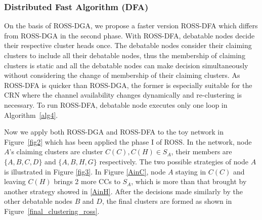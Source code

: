 \documentclass[10pt,journal,compsoc]{IEEEtran}
\theoremstyle{mytheoremstyle}
\theoremstyle{mytheoremstyle}
\theoremstyle{mytheoremstyle}
\begin{document}
\subsubsection{Distributed Fast Algorithm (DFA)}
On the basis of ROSS-DGA, we propose a faster version ROSS-DFA which differs from ROSS-DGA in the second phase.
With ROSS-DFA, debatable nodes decide their respective cluster heads once.
The debatable nodes consider their claiming clusters to include all their debatable nodes, thus the membership of claiming clusters is static and all the debatable nodes can make decision simultaneously without considering the change of membership of their claiming clusters.
As ROSS-DFA is quicker than ROSS-DGA, the former is especially suitable for the CRN where the channel availability changes dynamically and re-clustering is necessary.
To run ROSS-DFA, debatable node executes only one loop in Algorithm~\ref{alg4}.

Now we apply both ROSS-DGA and ROSS-DFA to the toy network in Figure~\ref{fig2} which has been applied the phase I of ROSS.
In the network, node $A$'s claiming clusters are cluster $C(C), C(H)\in S_A$, their members are $\{A,B,C,D\}$ and $\{A,B,H,G\}$ respectively. 
The two possible strategies of node $A$ is illustrated in Figure \ref{fig3}.
In Figure \ref{AinC}, node $A$ staying in $C(C)$ and leaving $C(H)$ brings 2 more CCs to $S_A$, which is more than that brought by another strategy showed in \ref{AinH}.
After the decisions made similarly by the other debatable nodes $B$ and $D$, the final clusters are formed as shown in Figure~\ref{final_clustering_ross}.

\end{document}
